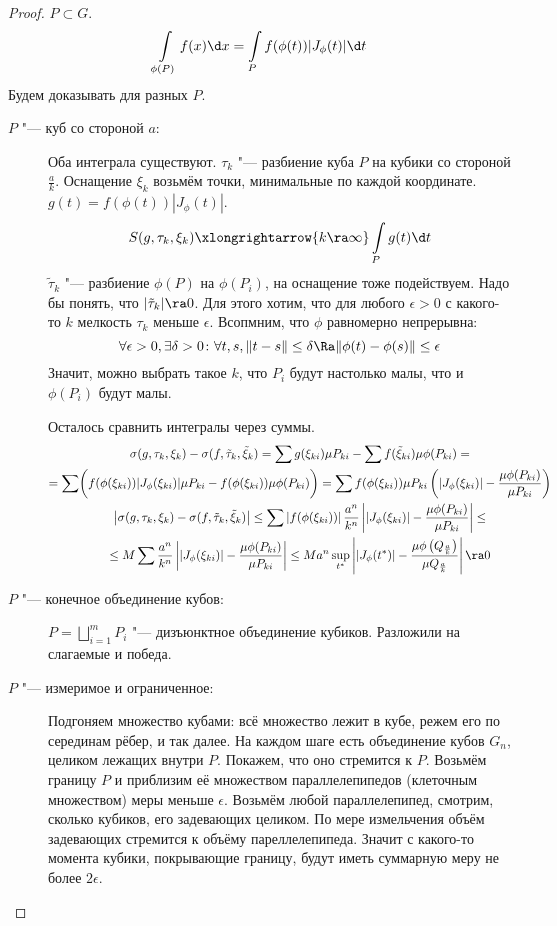 \begin{proof}
	$P \subset G$.
	\[ \int\limits_{\phi(P)} f(x) \d x = \int\limits_P f(\phi(t)) |J_\phi(t)| \d t \]
	Будем доказывать для разных $P$.
	\begin{description}
	\item[$P$ "--- куб со стороной $a$:]
		Оба интеграла существуют.
		$\tau_k$ "--- разбиение куба $P$ на кубики со стороной $\frac{a}k$.
		Оснащение $\xi_k$ возьмём точки, минимальные по каждой координате.
		$g(t) = f(\phi(t)) |J_\phi(t)|$.
		\[
			S(g, \tau_k, \xi_k) \xlongrightarrow{k \ra \infty} \int\limits_P g(t) \d t \\
		\]
		$\tilde \tau_k$ "--- разбиение $\phi(P)$  на $\phi(P_i)$, на оснащение тоже подействуем.
		Надо бы понять, что $|\tilde \tau_k| \ra 0$.
		Для этого хотим, что для любого $\epsilon > 0$ с какого-то $k$ мелкость $\tau_k$ меньше $\epsilon$.
		Всопмним, что $\phi$ равномерно непрерывна:
		\[
			\forall \epsilon > 0, \exists \delta > 0\colon \forall t,s, \|t-s\| \le \delta \Ra \|\phi(t) - \phi(s)\| \le \epsilon
		\]
		Значит, можно выбрать такое $k$, что $P_i$ будут настолько малы, что и $\phi(P_i)$ будут малы.

		Осталось сравнить интегралы через суммы.
		\begin{gather*}
			\sigma(g, \tau_k, \xi_k) - \sigma(f, \tilde \tau_k, \tilde \xi_k)
			= \sum g(\xi_{ki}) \mu P_{ki} - \sum f(\tilde\xi_{ki}) \mu \phi(P_{ki}) = \\
			= \sum \biggl( f(\phi(\xi_{ki})) |J_\phi (\xi_{ki})| \mu P_{ki} - f(\phi(\xi_{ki})) \mu \phi(P_{ki}) \biggr)
			= \sum f(\phi(\xi_{ki})) \mu P_{ki} \left( |J_\phi (\xi_{ki})| - \frac{\mu \phi(P_{ki})}{\mu P_{ki}} \right) \\
			\left| \sigma(g, \tau_k, \xi_k) - \sigma(f, \tilde \tau_k, \tilde \xi_k) \right|
			\le \sum\left|f(\phi(\xi_{ki}))\right|\frac{a^n}{k^n} \left||J_\phi (\xi_{ki})| - \frac{\mu\phi(P_{ki})}{\mu P_{ki}} \right| \le \\ 
			\le M \sum \frac{a^n}{k^n} \left| |J_\phi (\xi_{ki})| - \frac{\mu \phi(P_{ki})}{\mu P_{ki}} \right|
			\le M a^n \sup_{t^*} \left| |J_\phi (t^*)| - \frac{\mu \phi\left(Q_{\frac{a}k}\right)}{\mu Q_{\frac{a}k}} \right| \ra 0
		\end{gather*}

	\item[$P$ "--- конечное объединение кубов:]
		$P = \bigsqcup_{i=1}^m P_i$ "--- дизъюнктное объединение кубиков.
		Разложили на слагаемые и победа.

	\item[$P$ "--- измеримое и ограниченное:]
		Подгоняем множество кубами: всё множество лежит в кубе, режем его по серединам рёбер, и так далее.
		На каждом шаге есть объединение кубов $G_n$, целиком лежащих внутри $P$.
		Покажем, что оно стремится к $P$.
		Возьмём границу $P$ и приблизим её множеством параллелепипедов (клеточным множеством) меры меньше $\epsilon$.
		Возьмём любой параллелепипед, смотрим, сколько кубиков, его задевающих целиком.
		По мере измельчения объём задевающих стремится к объёму пареллелепипеда.
		Значит с какого-то момента кубики, покрывающие границу, будут иметь суммарную меру не более $2\epsilon$.
	\end{description}
\end{proof}